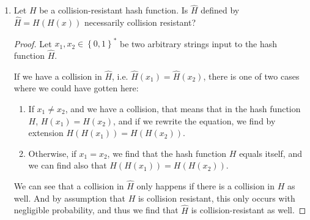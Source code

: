 \documentclass{article}
\DeclareMathOperator{\Mac}{\textsf{Mac}}
\begin{document}
\begin{enumerate}
\begin{enumerate}
\begin{proof}
          \[
            m' = r \Vert (b_1 \oplus t_r) \Vert b_2
          \]

          With this, the tag for the new message $m'$ is calculated as:

          \begin{align*}
            t' &= F_k(F_k(F_k(0^n \oplus r) \oplus (b_1 \oplus t_r)) \oplus b_2)\\
               &= F_k(F_k(t_r \oplus (b_1 \oplus t_r)) \oplus r_2)\\
               &= F_k(F_k(0^n \oplus b_1) \oplus b_2)\\
            t' &= t
          \end{align*}

          Thus, since we have not explicitly asked the $\Mac$ oracle for the tag
          of $m'$, we find that we have successfully forged a tag for a message
          of length $3n$ from a message of length $2n$. Thus, we have shown that
          this attack is possible.
        \end{proof}
    \end{enumerate}
  \item Let $H$ be a collision-resistant hash function. Is $\hat{H}$ defined by
    $\hat{H} = H(H(x))$ necessarily collision resistant?

    \begin{proof}
      Let $x_1, x_2 \in \left\{0, 1\right\}^{*}$ be two arbitrary strings input
      to the hash function $\hat{H}$.

      If we have a collision in $\hat{H}$, i.e. $\hat{H}(x_1) = \hat{H}(x_2)$,
      there is one of two cases where we could have gotten here:
      \begin{enumerate}
        \item If $x_1 \neq x_2$, and we have a collision, that means that in the
          hash function $H$, $H(x_1) = H(x_2)$, and if we rewrite the equation, 
          we find by extension $H(H(x_1)) = H(H(x_2))$.
        \item Otherwise, if $x_1 = x_2$, we find that the hash function $H$
          equals itself, and we can find also that $H(H(x_1)) = H(H(x_2))$.
      \end{enumerate}

      We can see that a collision in $\hat{H}$ only happens if there is a
      collision in $H$ as well. And by assumption that $H$ is collision
      resistant, this only occurs with negligible probability, and thus we find 
      that $\hat{H}$ is collision-resistant as well.
    \end{proof}


\end{enumerate}
\end{document}
